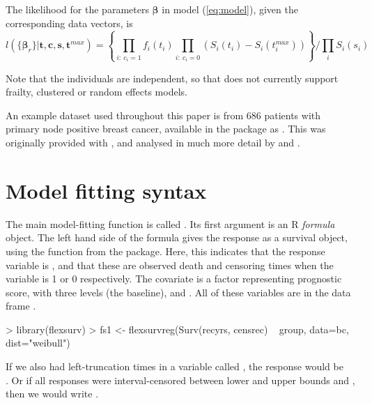 \documentclass[nojss,nofooter]{jss}
\begin{document}
The likelihood for the parameters $\bm{\beta}$ in model
(\ref{eq:model}), given the corresponding data vectors, is
\begin{equation}
  \label{eq:lik}
  l(\{\bm{\beta}_r\} | \mathbf{t},\mathbf{c},\mathbf{s},\mathbf{t}^{max}) = \left\{ \prod_{i:\ c_i=1} f_i(t_i) \prod_{i:\ c_i=0} \left(S_i(t_i) - S_i(t^{max}_i)\right)\right\} / \prod_i S_i(s_i)  
\end{equation}

Note that the individuals are independent, so that  does not
currently support frailty, clustered or random effects models.

An example dataset used throughout this paper is from 686 patients
with primary node positive breast cancer, available in the package as
. This was originally provided with  \citet{stpm:orig},
and analysed in much more detail by \citet{royston:parmar} and
\citet{sauerbrei1999building}.


\section{Model fitting syntax} 

The main model-fitting function is called .  Its
first argument is an R \emph{formula} object.  The left hand side of
the formula gives the response as a survival object, using the
 function from the  package.  Here, this
indicates that the response variable is , and that these
are observed death and censoring times when the variable
 is 1 or 0 respectively.  The covariate  is
a factor representing prognostic score, with three levels
 (the baseline),  and
. All of these variables are in the data frame
.
\begin{Schunk}
\begin{Sinput}
> library(flexsurv)
> fs1 <- flexsurvreg(Surv(recyrs, censrec) ~ group, data=bc, dist="weibull")
\end{Sinput}
\end{Schunk}

If we also had left-truncation times in a variable called
, the response would be \\ .
Or if all responses were interval-censored between lower and upper
bounds  and , then we would write
.
\end{document}
